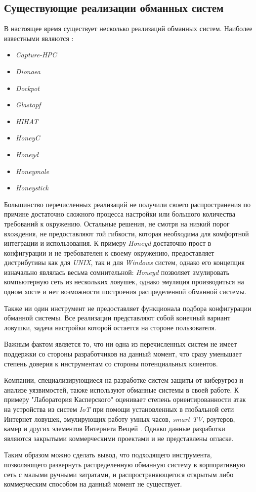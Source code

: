 \subsection{Существующие реализации обманных систем}

В настоящее время существует несколько реализаций обманных систем. Наиболее известными являются \citep{honeynet}:
\begin{itemize}
\item \textit{Capture-HPC}
\item \textit{Dionaea}
\item \textit{Dockpot}
\item \textit{Glastopf}
\item \textit{HIHAT}
\item \textit{HoneyC}
\item \textit{Honeyd}
\item \textit{Honeymole}
\item \textit{Honeystick}
\end{itemize}

Большинство перечисленных реализаций не получили своего распространения по причине достаточно сложного процесса настройки или большого количества требований к окружению. Остальные решения, не смотря на низкий порог вхождения, не предоставляют той гибкости, которая необходима для комфортной интеграции и использования. К примеру \textit{Honeyd} достаточно прост в конфигурации и не требователен к своему окружению, предоставляет дистрибутивы как для \textit{UNIX}, так и для \textit{Windows} систем, однако его концепция изначально являлась весьма сомнительной: \textit{Honeyd} позволяет эмулировать компьютерную сеть из нескольких ловушек, однако эмуляция производиться на одном хосте и нет возможности построения распределенной обманной системы.

Также ни один инструмент не предоставляет функционала подбора конфигурации обманной системы. Все реализации представляют собой конечный вариант ловушки, задача настройки которой остается на стороне пользователя.

Важным фактом является то, что ни одна из перечисленных систем не имеет поддержки со стороны разработчиков на данный момент, что сразу уменьшает степень доверия к инструментам со стороны потенциальных клиентов.

Компании, специализирующиеся на разработке систем защиты от киберугроз и анализе уязвимостей, также используют обманные системы в своей работе. К примеру "Лаборатория Касперского" оценивает степень ориентированности атак на устройства из систем \textit{IoT} при помощи установленных в глобальной сети Интернет ловушек, эмулирующих работу умных часов, \textit{smart TV}, роутеров, камер и других элементов Интернета Вещей \citep{kaspersky}. Однако данные разработки являются закрытыми коммерческими проектами и не представлены огласке.

Таким образом можно сделать вывод, что подходящего инструмента, позволяющего развернуть распределенную обманную систему в корпоративную сеть с малыми ручными затратами, и распространяющегося открытым либо коммерческим способом на данный момент не существует.